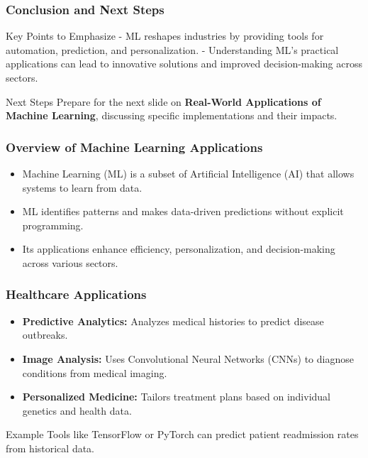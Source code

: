 \documentclass[aspectratio=169]{beamer}
\begin{document}
\begin{frame}[fragile]
    \frametitle{Conclusion and Next Steps}
    \begin{block}{Key Points to Emphasize}
        - ML reshapes industries by providing tools for automation, prediction, and personalization.
        - Understanding ML's practical applications can lead to innovative solutions and improved decision-making across sectors.
    \end{block}
    \begin{block}{Next Steps}
        Prepare for the next slide on \textbf{Real-World Applications of Machine Learning}, discussing specific implementations and their impacts.
    \end{block}
\end{frame}

\begin{frame}[fragile]
    \frametitle{Overview of Machine Learning Applications}
    \begin{itemize}
        \item Machine Learning (ML) is a subset of Artificial Intelligence (AI) that allows systems to learn from data.
        \item ML identifies patterns and makes data-driven predictions without explicit programming.
        \item Its applications enhance efficiency, personalization, and decision-making across various sectors.
    \end{itemize}
\end{frame}

\begin{frame}[fragile]
    \frametitle{Healthcare Applications}
    \begin{itemize}
        \item \textbf{Predictive Analytics:} Analyzes medical histories to predict disease outbreaks.
        \item \textbf{Image Analysis:} Uses Convolutional Neural Networks (CNNs) to diagnose conditions from medical imaging.
        \item \textbf{Personalized Medicine:} Tailors treatment plans based on individual genetics and health data.
    \end{itemize}
    \begin{block}{Example}
        Tools like TensorFlow or PyTorch can predict patient readmission rates from historical data.
    \end{block}
\end{frame}
\end{document}

